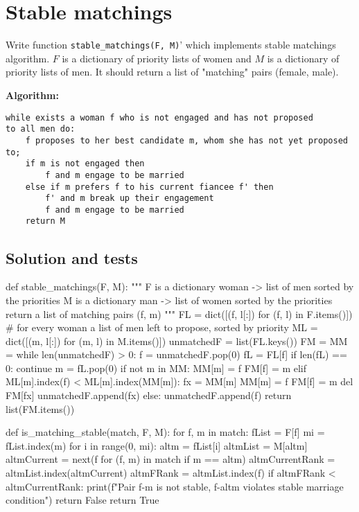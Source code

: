 \chapter{Stable matchings}

Write function \verb`stable_matchings(F, M)`' which implements stable matchings algorithm. $F$ is a dictionary of priority lists of women and $M$ is a dictionary of priority lists of men. It should return a list of "matching" pairs (female, male).

\medskip
\noindent \textbf{Algorithm:}
\begin{verbatim}
while exists a woman f who is not engaged and has not proposed
to all men do:
    f proposes to her best candidate m, whom she has not yet proposed to;
    if m is not engaged then
        f and m engage to be married
    else if m prefers f to his current fiancee f' then
        f' and m break up their engagement
        f and m engage to be married
    return M
\end{verbatim}

\section{Solution and tests}

\begin{sageCell}
def stable_matchings(F, M):
    """
    F is a dictionary woman -> list of men sorted by the priorities
    M is a dictionary man -> list of women sorted by the priorities
    return a list of matching pairs (f, m)
    """
    FL = dict([(f, l[:]) for (f, l) in F.items()]) # for every woman a list of men left to propose, sorted by priority
    ML = dict([(m, l[:]) for (m, l) in M.items()])
    unmatchedF = list(FL.keys())
    FM = {}
    MM = {}
    while len(unmatchedF) > 0:
        f = unmatchedF.pop(0)
        fL = FL[f]
        if len(fL) == 0:
            continue
        m = fL.pop(0)
        if not m in MM:
            MM[m] = f
            FM[f] = m
        elif ML[m].index(f) < ML[m].index(MM[m]):
            fx = MM[m]
            MM[m] = f
            FM[f] = m
            del FM[fx]
            unmatchedF.append(fx)
        else:
            unmatchedF.append(f)
    return list(FM.items())
\end{sageCell}

\begin{sageCell}
def is_matching_stable(match, F, M):
    for f, m in match:
        fList = F[f]
        mi = fList.index(m)
        for i in range(0, mi):
            altm = fList[i]
            altmList = M[altm]
            altmCurrent = next(f for (f, m) in match if m == altm)
            altmCurrentRank = altmList.index(altmCurrent)
            altmFRank = altmList.index(f)
            if altmFRank < altmCurrentRank:
                print(f"Pair {f}-{m} is not stable, {f}-{altm} violates stable marriage condition")
                return False
    return True
\end{sageCell}

